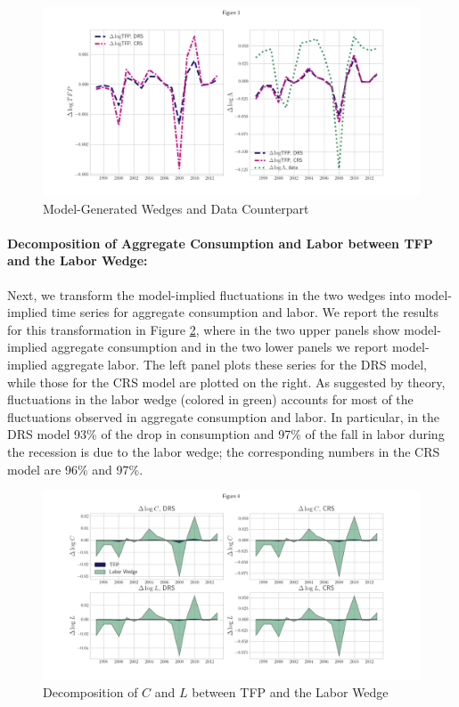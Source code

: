 \documentclass[english,letter,11pt,twoside]{article}
\begin{document}
\begin{figure}[!h]
\centering
\includegraphics[scale=0.5]{figure3.png}
\caption{Model-Generated Wedges and Data Counterpart}
\label{model_wedges}
\end{figure}

\paragraph*{Decomposition of Aggregate Consumption and Labor between TFP and the Labor Wedge:}

Next, we transform the model-implied fluctuations in the two wedges into model-implied time series for aggregate consumption and labor. We report the results for this transformation in Figure \ref{decomposition}, where in the two upper panels show model-implied aggregate consumption and in the two lower panels we report model-implied aggregate labor. The left panel plots these series for the DRS model, while those for the CRS
model are plotted on the right. As suggested by theory, fluctuations in the labor wedge (colored in green) accounts for most of the fluctuations observed in aggregate consumption and labor. In particular, in the DRS model 93\% of the drop in consumption and 97\% of the fall in labor
during the recession is due to the labor wedge; the corresponding numbers in the CRS model are 96\% and 97\%.

\begin{figure}[!h]
\centering
\includegraphics[scale=0.5]{figure4.png}
\caption{Decomposition of $C$ and $L$ between TFP and the Labor Wedge}
\label{decomposition}
\end{figure}
\end{document}
